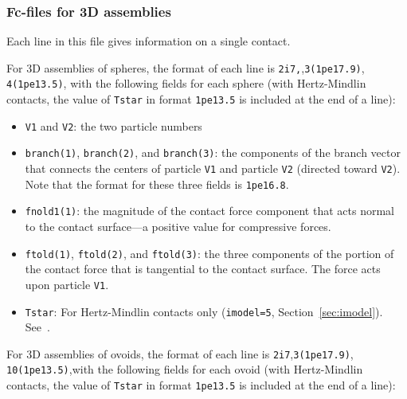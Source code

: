 \documentclass[letterpaper,11pt]{article}
\begin{document}
\subsubsection{Fc-files for 3D assemblies}\label{sec:f3files3d}
Each line in this file gives information on a single contact.
\par
For 3D assemblies of spheres,
the format of each line is \texttt{2i7,},\texttt{3(1pe17.9)},
\texttt{4(1pe13.5)}, with
the following fields for each sphere
(with Hertz-Mindlin contacts, the value of \texttt{Tstar} in
format \texttt{1pe13.5} is included at the end of a line):
\begin{itemize}
\item
\texttt{V1} and \texttt{V2}:
the two particle numbers
\item
\texttt{branch(1)}, \texttt{branch(2)}, and \texttt{branch(3)}:
the components of the branch vector that
connects the centers of particle \texttt{V1} and particle \texttt{V2}
(directed toward \texttt{V2}).  Note that the format for these three fields
is \texttt{1pe16.8}.
\item
\texttt{fnold1(1)}:
the magnitude of the contact force 
component that acts normal to the contact surface---a
positive value for compressive forces.
\item
\texttt{ftold(1)}, \texttt{ftold(2)}, and \texttt{ftold(3)}:
the three components of the portion of the contact force
that is tangential to the contact surface.
The force acts upon particle \texttt{V1}.
\item
\texttt{Tstar}:
For Hertz-Mindlin contacts only (\texttt{imodel=5},
Section~\ref{sec:imodel}). See~\cite{Thornton:1988a}.
\end{itemize}
%
\par
For 3D assemblies of ovoids,
the format of each line is \texttt{2i7},\texttt{3(1pe17.9)},
\texttt{10(1pe13.5)},with
the following fields
for each ovoid
(with Hertz-Mindlin contacts, the value of \texttt{Tstar} in
format \texttt{1pe13.5} is included at the end of a line):
\end{document}
